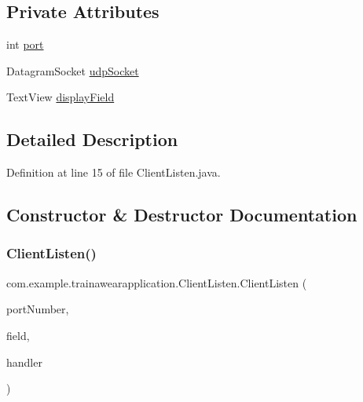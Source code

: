 \subsection*{Private Attributes}
\begin{DoxyCompactItemize}
\item 
int \mbox{\hyperlink{classcom_1_1example_1_1trainawearapplication_1_1_client_listen_a9835e7e202b86f8b019671b86508313a}{port}}
\item 
Datagram\+Socket \mbox{\hyperlink{classcom_1_1example_1_1trainawearapplication_1_1_client_listen_a008375f58e870216d43730ef43964b61}{udp\+Socket}}
\item 
Text\+View \mbox{\hyperlink{classcom_1_1example_1_1trainawearapplication_1_1_client_listen_a832fe2d0515add95ba938249831116bc}{display\+Field}}
\end{DoxyCompactItemize}


\subsection{Detailed Description}


Definition at line 15 of file Client\+Listen.\+java.



\subsection{Constructor \& Destructor Documentation}
\mbox{\label{classcom_1_1example_1_1trainawearapplication_1_1_client_listen_a24ac2c031ded11c7a5ce64dae1694253}} 
\subsubsection{\texorpdfstring{ClientListen()}{ClientListen()}\hspace{0.1cm}{\footnotesize\ttfamily [1/2]}}
{\footnotesize\ttfamily com.\+example.\+trainawearapplication.\+Client\+Listen.\+Client\+Listen (\begin{DoxyParamCaption}\item[{int}]{port\+Number,  }\item[{Text\+View}]{field,  }\item[{\mbox{\hyperlink{classcom_1_1example_1_1trainawearapplication_1_1_udp_client_handler}{Udp\+Client\+Handler}}}]{handler }\end{DoxyParamCaption})}



